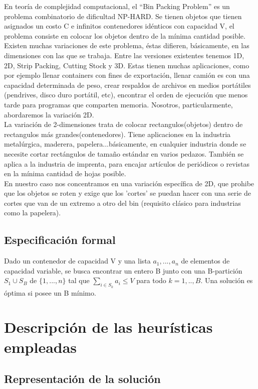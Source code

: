 \documentclass[a4paper,10pt]{article}
\begin{document}
En teoría de complejidad computacional, el ``Bin Packing Problem'' es un problema combinatorio de dificultad NP-HARD. Se tienen objetos que
tienen asignados un costo C e infinitos contenedores idénticos con capacidad V, el problema consiste en colocar los objetos dentro de la
mínima cantidad posible.\\
\indent Existen muchas variaciones de este problema, éstas difieren, básicamente, en las dimensiones con las que se trabaja.
Entre las versiones existentes tenemos 1D, 2D, Strip Packing, Cutting Stock y 3D. Estas tienen muchas aplicaciones, como por ejemplo llenar
containers con fines de exportación, llenar camión es con una capacidad determinada de peso, crear respaldos de archivos en medios portátiles
(pendrives, disco duro portátil, etc), encontrar el orden de ejecución que menos tarde para programas que comparten memoria. Nosotros, 
particularmente, abordaremos la variación 2D.\\ 
\indent La variación de 2-dimensiones trata de colocar rectangulos(objetos) dentro de rectangulos más grandes(contenedores). Tiene aplicaciones en la 
industria metalúrgica, maderera, papelera...básicamente, en cualquier industria donde se necesite cortar rectángulos de tamaño estándar en varios pedazos.
También se aplica a la industria de imprenta, para encajar artículos de periódicos o revistas en la mínima cantidad de hojas posible.\\
\indent En nuestro caso nos concentramos en una variación específica de 2D, que prohibe que los objetos se roten y exige que los 'cortes' se puedan
hacer con una serie de cortes que van de un extremo a otro del bin (requisito clásico para industrias como la papelera).

\subsection{Especificación formal}

Dado un contenedor de capacidad V y una lista $a_1, ..., a_n$ de elementos de capacidad variable, se busca encontrar un entero 
B junto con una B-partición $S_1 \cup S_B$ de $\{1,...,n\}$ tal que $\sum_{i \in S_k}^{} {a_i \le V}$ para todo $k = 1,..,B$. 
Una solución es óptima si posee un B mínimo. 

\section{Descripción de las heurísticas empleadas}

\subsection{Representación de la solución}
\end{document}
